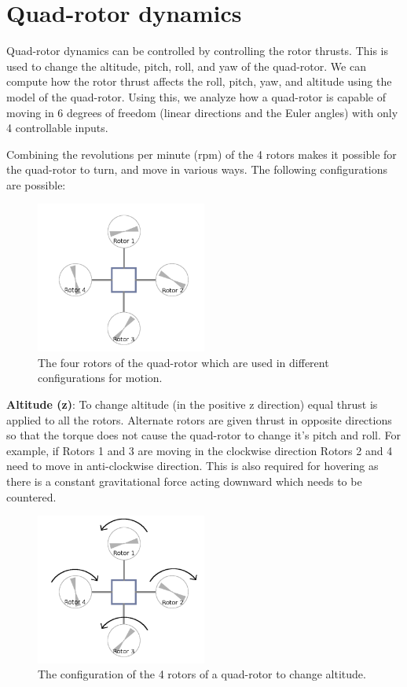 \documentclass[BTech]{iitmdiss}
\begin{document}
\chapter{Quad-rotor dynamics}

Quad-rotor dynamics can be controlled by controlling the rotor thrusts. This is used to change the altitude, pitch, roll, and yaw of the quad-rotor. We can compute how the rotor thrust affects the roll, pitch, yaw, and altitude using the model of the quad-rotor. Using this, we analyze how a quad-rotor is capable of moving in 6 degrees of freedom (linear directions and the Euler angles) with only 4 controllable inputs.

Combining the revolutions per minute (rpm) of the 4 rotors makes it possible for the quad-rotor to turn, and move in various ways. The following configurations are possible:

\begin{figure}[h]
  \centering
    \includegraphics[width=0.5\textwidth]{quadrotor_rotors_names.png}
    \caption{The four rotors of the quad-rotor which are used in different configurations for motion.}
\end{figure}

{\bf Altitude (z)}: To change altitude (in the positive z direction) equal thrust is applied to all the rotors. Alternate rotors are given thrust in opposite directions so that the torque does not cause the quad-rotor to change it's pitch and roll. For example, if Rotors 1 and 3 are moving in the clockwise direction Rotors 2 and 4 need to move in anti-clockwise direction. This is also required for hovering as there is a constant gravitational force acting downward which needs to be countered.

\begin{figure}[h]
  \centering
    \includegraphics[width=0.5\textwidth]{quadrotor_rotors_altitude.png}
    \caption{The configuration of the 4 rotors of a quad-rotor to change altitude.}
\end{figure}
\end{document}
